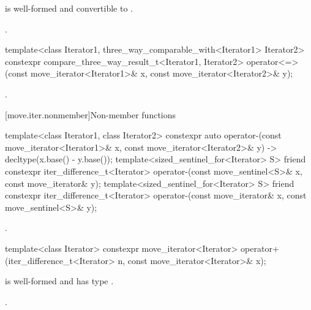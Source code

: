 \begin{itemdescr}
\pnum
\constraints
{} is well-formed and
convertible to .

\pnum
\returns
{}.
\end{itemdescr}

%
\begin{itemdecl}
template<class Iterator1, three_way_comparable_with<Iterator1> Iterator2>
  constexpr compare_three_way_result_t<Iterator1, Iterator2>
    operator<=>(const move_iterator<Iterator1>& x,
                const move_iterator<Iterator2>& y);
\end{itemdecl}

\begin{itemdescr}
\pnum
\returns
{}.
\end{itemdescr}

[move.iter.nonmember]{Non-member functions}

%
\begin{itemdecl}
template<class Iterator1, class Iterator2>
  constexpr auto operator-(const move_iterator<Iterator1>& x,
                           const move_iterator<Iterator2>& y)
    -> decltype(x.base() - y.base());
template<sized_sentinel_for<Iterator> S>
  friend constexpr iter_difference_t<Iterator>
    operator-(const move_sentinel<S>& x, const move_iterator& y);
template<sized_sentinel_for<Iterator> S>
  friend constexpr iter_difference_t<Iterator>
    operator-(const move_iterator& x, const move_sentinel<S>& y);
\end{itemdecl}

\begin{itemdescr}
\pnum
\returns
{}.
\end{itemdescr}

%
\begin{itemdecl}
template<class Iterator>
  constexpr move_iterator<Iterator>
    operator+(iter_difference_t<Iterator> n, const move_iterator<Iterator>& x);
\end{itemdecl}

\begin{itemdescr}
\pnum
\constraints
{} is well-formed and has type .

\pnum
\returns
{}.
\end{itemdescr}


